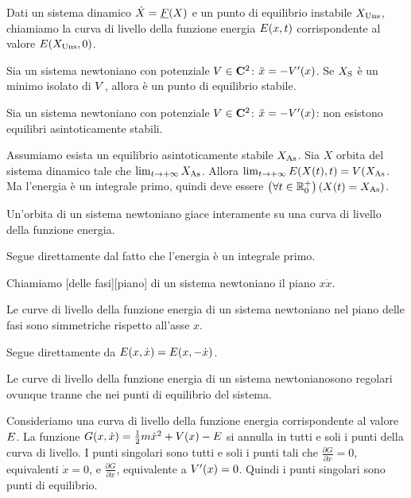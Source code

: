 \begin{Definition}
	Dati un sistema dinamico $\dot{X} = \underline{F}(X)$ e un punto di equilibrio instabile $X_\text{Uns}$, chiamiamo  la curva di livello della funzione energia $E(x,t)$ corrispondente al valore $E(X_\text{Uns},0)$.
\end{Definition}
\begin{Theorem}
	Sia un sistema newtoniano con potenziale $\PotentialEnergy \in \CClass{2}$: $\ddot{x} = - V'(x)$. Se $X_\text{S}$ \`e un minimo isolato di $V$, allora \`e un punto di equilibrio stabile.
\end{Theorem}
\begin{Theorem}
	Sia un sistema newtoniano con potenziale $\PotentialEnergy \in \CClass{2}$: $\ddot{x} = - V'(x)$: non esistono equilibri asintoticamente stabili.
\end{Theorem}
\Proof Assumiamo esista un equilibrio asintoticamente stabile $X_\text{As}$. Sia $X$ orbita del sistema dinamico tale che $\lim_{t \rightarrow + \infty} X_\text{As}$. Allora $\lim_{t \rightarrow + \infty} E(X(t),t) = V(X_\text{As}$. Ma l'energia \`e un integrale primo, quindi deve essere $\left ( \forall t \in \mathbb{R}^+_0 \right ) \left ( X(t) = X_\text{As} \right )$. \EndProof
\begin{Theorem}
	Un'orbita di un sistema newtoniano giace interamente su una curva di livello della funzione energia.
\end{Theorem}
\Proof Segue direttamente dal fatto che l'energia \`e un integrale primo. \EndProof
\begin{Definition}
	Chiamiamo [delle fasi][piano] di un sistema newtoniano il piano $x\dot{x}$.
\end{Definition}
\begin{Theorem}
	Le curve di livello della funzione energia di un sistema newtoniano nel piano delle fasi sono simmetriche rispetto all'asse $x$.
\end{Theorem}
\Proof Segue direttamente da $E(x,\dot{x}) = E(x,-\dot{x})$. \EndProof
\begin{Theorem}
	Le curve di livello della funzione energia di un sistema newtonianosono regolari ovunque tranne che nei punti di equilibrio del sistema.
\end{Theorem}
\Proof Consideriamo una curva di livello della funzione energia corrispondente al valore $E$.  La funzione $G(x,\dot{x}) = \frac{1}{2}m\dot{x}^2 + V(x) - E$ si annulla in tutti e soli i punti della curva di livello. I punti singolari sono tutti e soli i punti tali che $\frac{\partial G}{\partial \dot{x}} = 0$, equivalenti $\dot{x} = 0$, e $\frac{\partial{G}}{\partial{x}}$, equivalente a $V'(x) = 0$. Quindi i punti singolari sono punti di equilibrio. \EndProof
